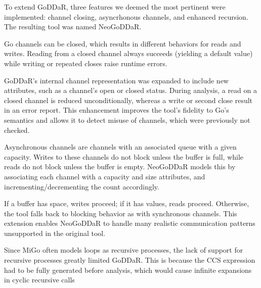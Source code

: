 \documentclass[runningheads]{llncs}
\begin{document}
To extend GoDDaR, three features we deemed the most pertinent were implemented: channel closing, asyncrhonous channels, and enhanced recursion.
The resulting tool was named NeoGoDDaR.

Go channels can be closed, which results in different behaviors for reads and writes.
Reading from a closed channel always succeeds (yielding a default value) while writing or repeated closes raise runtime errors.

GoDDaR's internal channel representation was expanded to include new attributes, such as a channel's open or closed status.
During analysis, a read on a closed channel is reduced unconditionally, whereas a write or second close result in an error report.
This enhancement improves the tool’s fidelity to Go’s semantics and allows it to detect misuse of channels, which were previously not checked.

Asynchronous channels are channels with an associated queue with a given capacity.
Writes to these channels do not block unless the buffer is full, while reads do not block unless the buffer is empty.
NeoGoDDaR models this by associating each channel with a capacity and size attributes, and incrementing/decrementing the count accordingly.

If a buffer has space, writes proceed; if it has values, reads proceed.
Otherwise, the tool falls back to blocking behavior as with synchronous channels.
This extension enables NeoGoDDaR to handle many realistic communication patterns unsupported in the original tool.

Since MiGo often models loops as recursive processes, the lack of support for recursive processes greatly limited GoDDaR.
This is because the CCS expression had to be fully generated before analysis, which would cause infinite expansions in cyclic recursive calls
\end{document}

